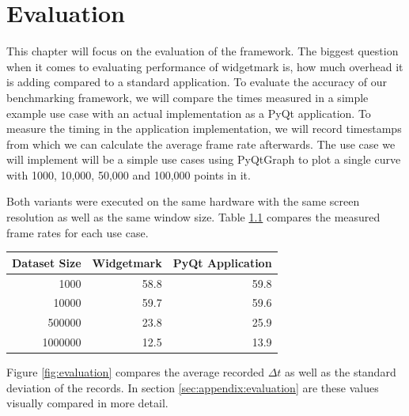 
\chapter{Evaluation}
\label{ch:Evaluation}

This chapter will focus on the evaluation of the framework. The biggest question
when it comes to evaluating performance of widgetmark is, how much overhead it
is adding compared to a standard application. To evaluate the accuracy of our
benchmarking framework, we will compare the times measured in a simple example
use case with an actual implementation as a PyQt application. To
measure the timing in the application implementation, we will record timestamps
from which we can calculate the average frame rate afterwards. The use case we
will implement will be a simple use cases using PyQtGraph to plot a single curve
with 1000, 10,000, 50,000 and 100,000 points in it. 

Both variants were executed on the same hardware with the same screen
resolution as well as the same window size. Table \ref{tab:evaluation} compares
the measured frame rates for each use case.

\begin{table}[h]
\begin{center}

\label{tab:evaluation}

\begin{tabular}{rrr}

\hline
Dataset Size & Widgetmark & PyQt Application \\
\hline
1000         & 58.8       & 59.8             \\
10000        & 59.7       & 59.6             \\
500000       & 23.8       & 25.9             \\
1000000      & 12.5       & 13.9             \\
\hline

\end{tabular}
\end{center}
\end{table}

Figure \ref{fig:evaluation} compares the average recorded $\Delta t$ as well as
the standard deviation of the records. In section \ref{sec:appendix:evaluation}
are these values visually compared in more detail.

